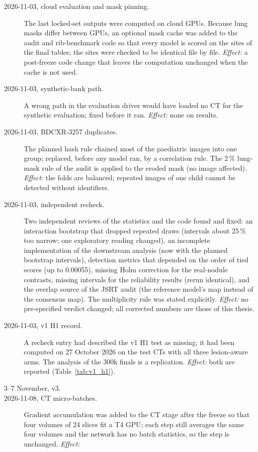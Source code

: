 \begin{description}
\item[2026-11-03, cloud evaluation and mask pinning.] The last locked-set outputs were computed on cloud GPUs. Because lung masks differ between
 GPUs, an optional mask cache was added to the audit and rib-benchmark code so that every model is scored on the sites of the final tables; the
 sites were checked to be identical file by file. \emph{Effect:} a post-freeze code change that leaves the computation unchanged when the cache is
 not used.
\item[2026-11-03, synthetic-bank path.] A wrong path in the evaluation driver would have loaded no CT for the synthetic evaluation; fixed before
 it ran. \emph{Effect:} none on results.
\item[2026-11-03, BDCXR-3257 duplicates.] The planned hash rule chained most of the paediatric images into one group; replaced, before any model
 ran, by a correlation rule. The 2\,\% lung-mask rule of the audit is applied to the eroded mask (no image affected). \emph{Effect:} the folds
 are balanced; repeated images of one child cannot be detected without identifiers.
\item[2026-11-03, independent recheck.] Two independent reviews of the statistics and the code found and fixed: an interaction bootstrap that
 dropped repeated draws (intervals about 25\,\% too narrow; one exploratory reading changed), an incomplete implementation of the downstream
 analysis (now with the planned bootstrap intervals), detection metrics that depended on the order of tied scores (up to 0.00055), missing Holm
 correction for the real-nodule contrasts, missing intervals for the reliability results (rerun identical), and the overlap source of the JSRT
 audit (the reference model's map instead of the consensus map). The multiplicity rule was stated explicitly. \emph{Effect:} no
 pre-specified verdict changed; all corrected numbers are those of this thesis.
\item[2026-11-03, v1 H1 record.] A recheck entry had described the v1 H1 test as missing; it had been computed on 27 October 2026 on the test CTs
 with all three lesion-aware arms. The analysis of the 300k finals is a replication. \emph{Effect:} both are reported (Table~\ref{tab:v1_h1}).
\item[3--7 November, v3.] 
\item[2026-11-08, CT micro-batches.] Gradient accumulation was added to the CT stage after the freeze so that four volumes of 24 slices fit a
 T4 GPU; each step still averages the same four volumes and the network has no batch statistics, so the step is unchanged. \emph{Effect:}

\end{description}
